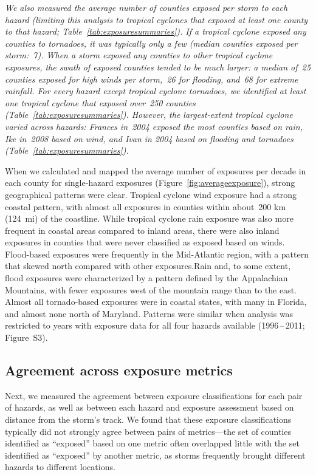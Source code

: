 \textit{We also measured the average number of counties exposed per storm to each
hazard (limiting this analysis to tropical cyclones that exposed at least one
county to that hazard; Table~\ref{tab:exposuresummaries}).  If a tropical
cyclone exposed any counties to tornadoes, it was typically only a few (median
counties exposed per storm:~7). When a storm exposed any counties to other
tropical cyclone exposures, the swath of exposed counties tended to be much
larger: a median of~25 counties exposed for high winds per storm,~26 for
flooding, and~68 for extreme rainfall.  For every hazard except tropical
cyclone tornadoes, we identified at least one tropical cyclone that exposed
over~250 counties (Table~\ref{tab:exposuresummaries}).  However, the
largest-extent tropical cyclone varied across hazards: Frances in~2004 exposed
the most counties based on rain, Ike in~2008 based on wind, and Ivan in 2004
based on flooding and tornadoes (Table~\ref{tab:exposuresummaries}).}

When we calculated and mapped the average number of exposures per decade in
each county for single-hazard exposures (Figure~\ref{fig:averageexposure}),
strong geographical patterns were clear. Tropical cyclone wind exposure had a
strong coastal pattern, with almost all exposures in counties within about~200
\si{\kilo\metre} (124~mi) of the coastline. While tropical cyclone rain
exposure was also more frequent in coastal areas compared to inland areas,
there were also inland exposures in counties that were never classified as
exposed based on winds. Flood-based exposures were frequently in the
Mid-Atlantic region, with a pattern that skewed north compared with other
exposures.Rain and, to some extent, flood exposures were characterized by a
pattern defined by the Appalachian Mountains, with fewer exposures west of the
mountain range than to the east. Almost all tornado-based exposures were in
coastal states, with many in Florida, and almost none north of Maryland.
Patterns were similar when analysis was restricted to years with exposure data
for all four hazards available (1996\,--\,2011; Figure~S3). 

\subsection*{Agreement across exposure metrics}

Next, we measured the agreement between exposure classifications for each pair
of hazards, as well as between each hazard and exposure assessment based on
distance from the storm's track. We found that these exposure classifications
typically did not strongly agree between pairs of metrics---the set of counties
identified as ``exposed'' based on one metric often overlapped little with the set
identified as ``exposed'' by another metric, as storms frequently brought
different hazards to different locations. 

